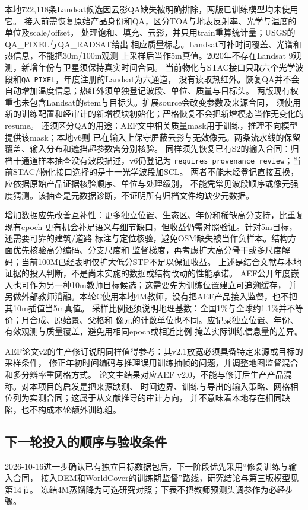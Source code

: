\documentclass[UTF8,fontset=fandol,zihao=5,a4paper]{ctexart}
\begin{document}
本地722{,}118条Landsat候选因云影QA缺失被明确排除，两版已训练模型均未使用它。
接入前需恢复原始产品身份和QA，区分TOA与地表反射率、光学与温度的单位及scale/offset，
处理饱和、填充、云影，并只用train重算统计量；USGS的QA\_PIXEL与QA\_RADSAT给出
相应质量标志\cite{landsatqa}。Landsat可补时间覆盖、光谱和热信息，不能把30m/100m观测
上采样后当作5m真值。2020年不存在Landsat 9观测，新增年份与卫星须保持真实时间合同。
当前物化与STAC接口只取六个光学波段和\texttt{QA\_PIXEL}，年度注册的Landsat为六通道，
没有读取热红外。恢复QA并不会自动增加温度信息；热红外须单独登记波段、单位、质量与目标头。
两版现有权重也未包含Landsat的stem与目标头。扩展source会改变参数及来源合同，
须使用新的训练配置和经审计的新增模块初始化；严格恢复不会把新增模态当作无变化的resume。
还须区分QA的用途：AEF文中相关质量mask用于训练，推理不向模型提供该mask；本地v6则
已在输入上保守屏蔽云影与无效像元。两条流水线的保留覆盖、输入分布和遮挡超参数需分别核验。
同样须先恢复已有S2的输入合同：归档十通道样本抽查没有波段描述，v6仍登记为
\texttt{requires\_provenance\_review}；当前STAC/物化接口选择的是十一光学波段加SCL。
两者不能未经登记直接互换，应依据原始产品证据核验顺序、单位与处理级别，
不能凭常见波段顺序或像元强度猜测。该抽查是元数据诊断，不证明所有归档文件均缺少元数据。

增加数据应先改善互补性：更多独立位置、生态区、年份和稀缺高分支持，比重复现有epoch
更有机会补足语义与细节缺口，但收益仍需对照验证。针对5m目标，还需要可靠的建筑/道路
标注与定位核验，避免OSM缺失被当作负样本。结构方面优先核验高分编码、分支尺度和
监督梯度，再考虑扩大高分骨干或多尺度解码；当前100M已经表明仅扩大低分STP不足以保证收益。
上述是结合文献与本地证据的投入判断，不是尚未实施的数据或结构改动的性能承诺。
AEF公开年度嵌入也可作为另一种10m教师目标候选；这需要先为训练位置建立可追溯缓存，
并另做外部教师消融。本轮C使用本地4M教师，没有把AEF产品接入监督，也不把其10m插值当5m真值。
采样比例还须说明地理基数：全国1\%与全球约1.1\%并不等价；月合成、原始景、父格和
像元的计数单位也不同。应记录独立位置、年份、有效观测与质量覆盖，避免用相同epoch或相近比例
掩盖实际训练信息量的差异\cite{aef}。

AEF论文v2的生产修订说明同样值得参考：其v2.1放宽必须具备特定来源或目标的采样条件，
修正年初时间编码与推理误用训练抽帧的问题，并调整地图监督混合和多分辨率重网格方式。
论文主结果对应AEF v2.0，不能与修订后生产产品混称。对本项目的启发是把来源缺测、
时间边界、训练与导出的输入策略、网格相位列为实测合同；这属于从文献推导的审计方向，
并不意味着本地存在相同缺陷，也不构成本轮额外训练组。

\subsection{下一轮投入的顺序与验收条件}
2026-10-16进一步确认已有独立目标数据包后，下一阶段优先采用“修复训练与输入合同，
接入DEM和WorldCover的训练期监督”路线，研究结论与第三版模型见第14节。
冻结4M蒸馏降为可选研究对照；下表不把教师预测头调参作为必经步骤。
\end{document}
